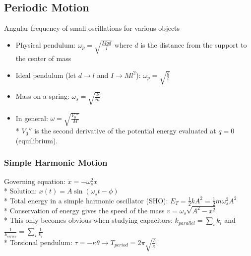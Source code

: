 \newpage

\subsection{Periodic Motion}
Angular frequency of small oscillations for various objects
\begin{itemize}
\item Physical pendulum: \(\omega_p=\sqrt{\frac{Mgd}{I}}\) where \(d\) is the distance from the support to the center of mass
\item Ideal pendulum (let \(d \to l\) and \(I \to Ml^2\)): \(\omega_p=\sqrt{\frac{g}{l}}\)
\item Mass on a spring: \(\omega_s=\sqrt{\frac{k}{m}}\)
\item In general: \(\omega=\sqrt{\frac{V_0''}{M}}\)\\*
\(V_0''\) is the second derivative of the potential energy evaluated at \(q=0\) (equilibrium).
\end{itemize}

\subsubsection{Simple Harmonic Motion}
Governing equation: \(\ddot{x}=-\omega_s^2x\)\\*
Solution: \(x(t)=A\sin(\omega_st-\phi)\)\\*
Total energy in a simple harmonic oscillator (SHO): \(E_T=\frac{1}{2}kA^2=\frac{1}{2}m\omega_s^2A^2\)\\*
Conservation of energy gives the speed of the mass \(v=\omega_s\sqrt{A^2-x^2}\)\\*
This only becomes obvious when studying capacitors: \(k_{parallel}=\sum_i k_i\) and \(\frac{1}{k_{series}}=\sum_i \frac{1}{k_i}\)\\*
Torsional pendulum: \(\tau=-\kappa\theta \to T_{period}=2\pi\sqrt{\frac{I}{\kappa}}\)

